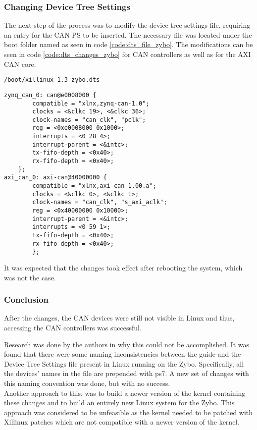\subsubsection*{Changing Device Tree Settings}
The next step of the process was to modify the device tree settings file, requiring an entry for the CAN PS to be inserted.
The necessary file was located under the boot folder named as seen in code \ref{code:dts_file_zybo}.
The modifications can be seen in code \ref{code:dts_changes_zybo} for CAN controllers as well as for the AXI CAN core.

\begin{lstlisting}[numbers=none,caption={Device tree settings file and its path.},label={code:dts_file_zybo}]
/boot/xillinux-1.3-zybo.dts
\end{lstlisting}
\begin{lstlisting}[caption={Device tree settings changes.},label={code:dts_changes_zybo}]
zynq_can_0: can@e0008000 {
        compatible = "xlnx,zynq-can-1.0";
        clocks = <&clkc 19>, <&clkc 36>;
        clock-names = "can_clk", "pclk";
        reg = <0xe0008000 0x1000>;
        interrupts = <0 28 4>;
        interrupt-parent = <&intc>;
        tx-fifo-depth = <0x40>;
        rx-fifo-depth = <0x40>;
    };
axi_can_0: axi-can@40000000 {
        compatible = "xlnx,axi-can-1.00.a";
        clocks = <&clkc 0>, <&clkc 1>;
        clock-names = "can_clk", "s_axi_aclk";
        reg = <0x40000000 0x10000>;
        interrupt-parent = <&intc>;
        interrupts = <0 59 1>;
        tx-fifo-depth = <0x40>;
        rx-fifo-depth = <0x40>;
        };
\end{lstlisting}
It was expected that the changes took effect after rebooting the system, which was not the case.

\subsubsection*{Conclusion}
After the changes, the CAN devices were still not visible in Linux and thus, accessing the CAN controllers was successful.

Research was done by the authors in why this could not be accomplished.
It was found that there were some naming inconsistencies between the guide and the Device Tree Settings file present in Linux running on the Zybo. Specifically, all the devices' names in the file are prepended with ps7.
A new set of changes with this naming convention was done, but with no success.\\

Another approach to this, was to build a newer version of the kernel containing these changes and to build an entirely new Linux system for the Zybo.
This approach was considered to be unfeasible as the kernel needed to be patched with Xillinux patches which are not compatible with a newer version of the kernel.

